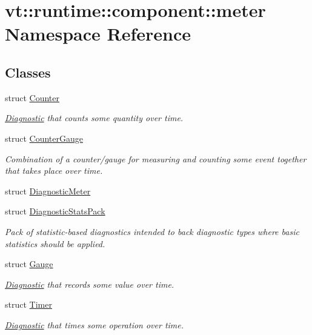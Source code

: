 \hypertarget{namespacevt_1_1runtime_1_1component_1_1meter}{}\section{vt\+:\+:runtime\+:\+:component\+:\+:meter Namespace Reference}
\label{namespacevt_1_1runtime_1_1component_1_1meter}
\subsection*{Classes}
\begin{DoxyCompactItemize}
\item 
struct \hyperlink{structvt_1_1runtime_1_1component_1_1meter_1_1_counter}{Counter}
\begin{DoxyCompactList}\small\item\em \hyperlink{structvt_1_1runtime_1_1component_1_1_diagnostic}{Diagnostic} that counts some quantity over time. \end{DoxyCompactList}\item 
struct \hyperlink{structvt_1_1runtime_1_1component_1_1meter_1_1_counter_gauge}{Counter\+Gauge}
\begin{DoxyCompactList}\small\item\em Combination of a counter/gauge for measuring and counting some event together that takes place over time. \end{DoxyCompactList}\item 
struct \hyperlink{structvt_1_1runtime_1_1component_1_1meter_1_1_diagnostic_meter}{Diagnostic\+Meter}
\item 
struct \hyperlink{structvt_1_1runtime_1_1component_1_1meter_1_1_diagnostic_stats_pack}{Diagnostic\+Stats\+Pack}
\begin{DoxyCompactList}\small\item\em Pack of statistic-\/based diagnostics intended to back diagnostic types where basic statistics should be applied. \end{DoxyCompactList}\item 
struct \hyperlink{structvt_1_1runtime_1_1component_1_1meter_1_1_gauge}{Gauge}
\begin{DoxyCompactList}\small\item\em \hyperlink{structvt_1_1runtime_1_1component_1_1_diagnostic}{Diagnostic} that records some value over time. \end{DoxyCompactList}\item 
struct \hyperlink{structvt_1_1runtime_1_1component_1_1meter_1_1_timer}{Timer}
\begin{DoxyCompactList}\small\item\em \hyperlink{structvt_1_1runtime_1_1component_1_1_diagnostic}{Diagnostic} that times some operation over time. \end{DoxyCompactList}\end{DoxyCompactItemize}
